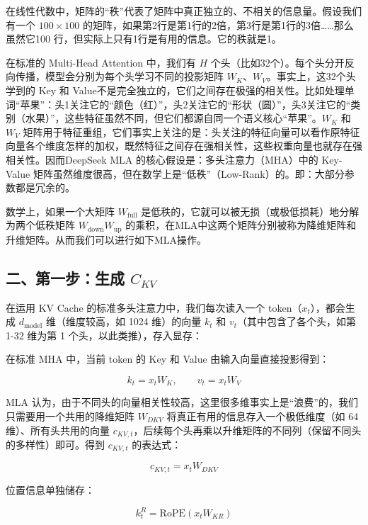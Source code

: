 在线性代数中，矩阵的``秩''代表了矩阵中真正独立的、不相关的信息量。假设我们有一个 \(100\times100\) 的矩阵，如果第2行是第1行的2倍，第3行是第1行的3倍\ldots\ldots 那么虽然它100 行，但实际上只有1行是有用的信息。它的秩就是1。

在标准的 Multi-Head Attention 中，我们有 \(H\) 个头（比如32个）。每个头分开反向传播，模型会分别为每个头学习不同的投影矩阵 \(W_K\)、\(W_V\)。事实上，这32个头学到的 Key 和 Value不是完全独立的，它们之间存在极强的相关性。比如处理单词``苹果''：头1关注它的``颜色（红）''，头2关注它的``形状（圆）''，头3关注它的``类别（水果）''，这些特征虽然不同，但它们都源自同一个语义核心``苹果''。\(W_K\) 和 \(W_V\) 矩阵用于特征重组，它们事实上关注的是：头关注的特征向量可以看作原特征向量各个维度怎样的加权，既然特征之间存在强相关性，这些权重向量也就存在强相关性。因而DeepSeek MLA 的核心假设是：多头注意力（MHA）中的 Key-Value 矩阵虽然维度很高，但在数学上是``低秩''（Low-Rank）的。即：大部分参数都是冗余的。

数学上，如果一个大矩阵 \(W_{\mathrm{full}}\) 是低秩的，它就可以被无损（或极低损耗）地分解为两个低秩矩阵 \(W_{\mathrm{down}}W_{\mathrm{up}}\) 的乘积，在MLA中这两个矩阵分别被称为降维矩阵和升维矩阵。从而我们可以进行如下MLA操作。

\hypertarget{ux4e8cux7b2cux4e00ux6b65ux751fux6210-c_kv}{%
\subsection{\texorpdfstring{二、第一步：生成 \(C_{KV}\)}{二、第一步：生成 C\_\{KV\}}}\label{ux4e8cux7b2cux4e00ux6b65ux751fux6210-c_kv}}

在运用 KV Cache 的标准多头注意力中，我们每次读入一个 token（\(x_t\)），都会生成 \(d_{\mathrm{model}}\) 维（维度较高，如 1024 维）的向量 \(k_t\) 和 \(v_t\)（其中包含了各个头，如第 1-32 维为第 1 个头，以此类推），存入显存：

在标准 MHA 中，当前 token 的 Key 和 Value 由输入向量直接投影得到：

\[
k_t = x_t W_K,\qquad v_t = x_t W_V
\]

MLA 认为，由于不同头的向量相关性较高，这里很多维事实上是``浪费''的，我们只需要用一个共用的降维矩阵 \(W_{DKV}\) 将真正有用的信息存入一个极低维度（如 64 维）、所有头共用的向量 \(c_{KV,t}\)，后续每个头再乘以升维矩阵的不同列（保留不同头的多样性）即可。得到 \(c_{KV,t}\) 的表达式：

\[
c_{KV,t} = x_t W_{DKV}
\]

位置信息单独储存：

\[
k_t^R = \mathrm{RoPE}(x_t W_{KR})
\]

